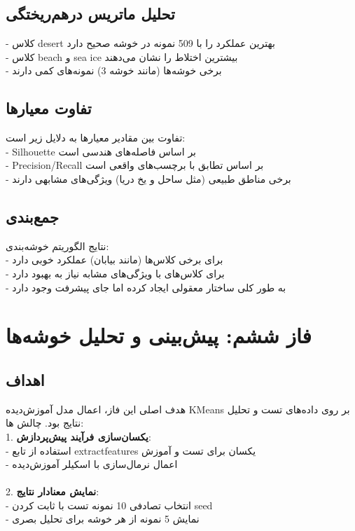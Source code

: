\documentclass[a4paper,12pt]{article}
\let\nobreaksection\section
\renewcommand{\section}{\nobreaksection}
\begin{document}
	\subsection*{\textbf{تحلیل ماتریس درهم‌ریختگی}}
	- کلاس desert بهترین عملکرد را با 509 نمونه در خوشه صحیح دارد
	\\
	- کلاس beach و sea ice بیشترین اختلاط را نشان می‌دهند
	\\
	- برخی خوشه‌ها (مانند خوشه 3) نمونه‌های کمی دارند

	
	\subsection*{\textbf{تفاوت معیارها}}
	تفاوت بین مقادیر معیارها به دلایل زیر است:
	\\
	- Silhouette بر اساس فاصله‌های هندسی است
	\\
	- Precision/Recall بر اساس تطابق با برچسب‌های واقعی است
	\\
	- برخی مناطق طبیعی (مثل ساحل و یخ دریا) ویژگی‌های مشابهی دارند
	
	\subsection*{\textbf{جمع‌بندی}}
	نتایج الگوریتم خوشه‌بندی:
	\\
	- برای برخی کلاس‌ها (مانند بیابان) عملکرد خوبی دارد
	\\
	- برای کلاس‌های با ویژگی‌های مشابه نیاز به بهبود دارد
	\\
	- به طور کلی ساختار معقولی ایجاد کرده اما جای پیشرفت وجود دارد
	
	
	
	\section{فاز ششم: پیش‌بینی و تحلیل خوشه‌ها}
	
	\subsection*{\textbf{اهداف }}
	هدف اصلی این فاز، اعمال مدل آموزش‌دیده KMeans بر روی داده‌های تست و تحلیل نتایج بود. چالش ها:
	\\
	1. \textbf{یکسان‌سازی فرآیند پیش‌پردازش}:
	\\
	- استفاده از تابع extractfeatures یکسان برای تست و آموزش
	\\
	- اعمال نرمال‌سازی با اسکیلر آموزش‌دیده
	\\
	\\
	2. \textbf{نمایش معنادار نتایج}:
	\\
	- انتخاب تصادفی 10 نمونه تست با ثابت کردن seed
	\\
	- نمایش 5 نمونه از هر خوشه برای تحلیل بصری
	
\end{document}
